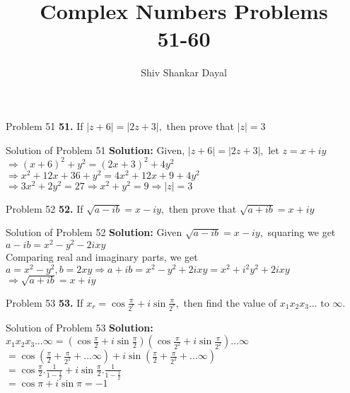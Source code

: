\documentclass[aspectratio=169,8pt]{beamer}
\title{Complex Numbers Problems\\ 51-60}
\author[Shiv Shankar Dayal]{Shiv Shankar Dayal}
\begin{document}
\begin{frame}
  \titlepage
\end{frame}
\begin{frame}{Problem 51}
  \textbf{51.} If $|z + 6| = |2z + 3|,$ then prove that $|z| = 3$
\end{frame}
\begin{frame}{Solution of Problem 51}
  \textbf{Solution:} Given, $|z + 6| = |2z + 3|,$ let $z = x + iy$\\
  \vspace*{0.2cm}
  $\Rightarrow (x + 6)^2 + y^2 = (2x + 3)^2 + 4y^2$\\
  \vspace*{0.2cm}
  $\Rightarrow x^2 + 12x + 36 + y^2 = 4x^2 + 12x + 9 + 4y^2$\\
  \vspace*{0.2cm}
  $\Rightarrow 3x^2 + 2y^2 = 27 \Rightarrow x^2 + y^2 = 9 \Rightarrow |z| = 3$
\end{frame}
\begin{frame}{Problem 52}
  \textbf{52.} If $\sqrt{a - ib} = x - iy,$ then prove that $\sqrt{a + ib} = x + iy$
\end{frame}
\begin{frame}{Solution of Problem 52}
  \textbf{Solution:} Given $\sqrt{a - ib} = x - iy,$ squaring we get\\
  \vspace*{0.2cm}
  $a - ib = x^2 - y^2 - 2ixy$\\
  \vspace*{0.2cm}
  Comparing real and imaginary parts, we get\\
  \vspace*{0.2cm}
  $a = x^2 - y^2, b = 2xy \Rightarrow a + ib = x^2 - y^2 + 2ixy = x^2 +i^2y^2 + 2ixy$\\
  \vspace*{0.2cm}
  $\Rightarrow \sqrt{a + ib} = x + iy$
\end{frame}
\begin{frame}{Problem 53}
  \textbf{53.} If $x_r = \cos\frac{\pi}{2^r} + i\sin\frac{\pi}{2^r},$ then find the value of $x_1x_2x_3\ldots \text{~to~}\infty.$
\end{frame}
\begin{frame}{Solution of Problem 53}
  \textbf{Solution:} $x_1x_2x_3\ldots\infty = \left(\cos\frac{\pi}{2} + i\sin\frac{\pi}{2}\right)\left(\cos\frac{\pi}{2^2} + i\sin\frac{\pi}{2^2}\right) \ldots\infty$\\
  \vspace*{0.2cm}
  $= \cos\left(\frac{\pi}{2} + \frac{\pi}{2^2} + \ldots \infty\right) + i\sin\left(\frac{\pi}{2} + \frac{\pi}{2^2} + \ldots \infty\right)$\\
  \vspace*{0.2cm}
  $= \cos\frac{\pi}{2}.\frac{1}{1- \frac{1}{2}} + i\sin\frac{\pi}{2}.\frac{1}{1- \frac{1}{2}}$\\
  \vspace*{0.2cm}
  $= \cos\pi + i\sin\pi = -1$
\end{frame}
\end{document}
